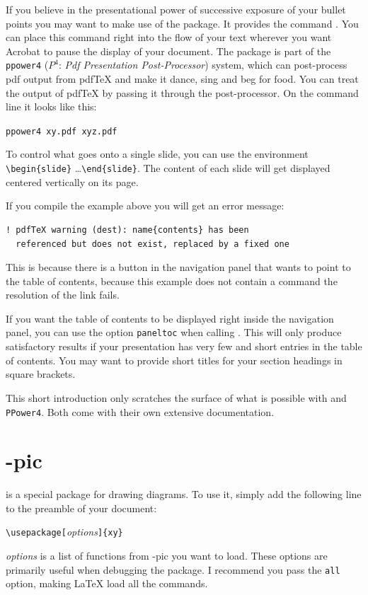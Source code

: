 If you believe in the presentational power of successive exposure of
your bullet points you may want
to make use of the  package. It provides the command
. You can place this command right into the flow of your
text wherever you want Acrobat to pause the display of your document.
The  package is part of the \texttt{ppower4} ($P^4$:
\emph{Pdf Presentation  Post-Processor}) system, which can post-process
pdf output from pdf\TeX{} and make it dance, sing and beg for
food. You can treat the output of pdf\TeX{} by passing it through the
post-processor. On the command line it looks like this:
\begin{lscommand}
\verb+ppower4 xy.pdf xyz.pdf+
\end{lscommand}

To control what goes onto a single slide, you can use the environment
\verb+\begin{slide}+ \ldots \verb+\end{slide}+. The content of each
slide will get displayed centered vertically on its page.

If you compile the example above you will get an error message:
\begin{verbatim}
! pdfTeX warning (dest): name{contents} has been
  referenced but does not exist, replaced by a fixed one
\end{verbatim}
This is because there is a button in the navigation panel that wants
to point to the table of contents, because this example does not
contain a  command the resolution of the link
fails.

If you want the table of contents to be displayed right inside the
navigation panel, you can use the option \texttt{paneltoc} when
calling . This will only produce satisfactory results
if your presentation has very few and short entries in the table of
contents. You may want to provide short titles for your section
headings in square brackets.

This short introduction only scratches the surface of what is
possible with  and \texttt{PPower4}. Both come with
their own extensive documentation.


\section{\texorpdfstring{\Xy}{Xy}-pic}
 is a special package for drawing diagrams. To use it,
simply add the following line to the preamble of your document:
\begin{lscommand}
\verb|\usepackage[|\emph{options}\verb|]{xy}|
\end{lscommand}
\emph{options} is a list of functions from \Xy-pic you want to
load. These options are primarily useful when debugging the package.  I recommend
you pass the \verb!all! option, making \LaTeX{} load all the \Xy{} commands.

